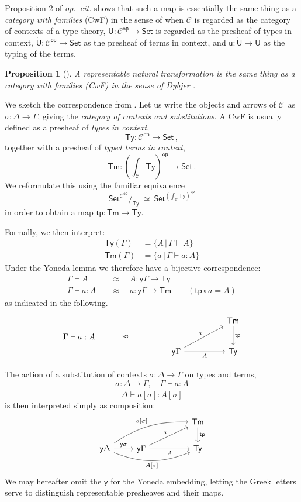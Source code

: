 \documentclass[12pt,reqno]{amsart}
\newcommand{\CC}{\ensuremath{\mathcal{C}}}
\newcommand{\op}[1]{\ensuremath{{#1}^{\mathsf{op}}}}
\newcommand{\pshx}[1]{\ensuremath{\mathsf{Set}^{\op{#1}}}}
\newcommand{\Set}{\ensuremath{\mathsf{Set}}}
\newcommand{\y}{\ensuremath{\mathsf{y}}} %
\newcommand{\tp}{\ensuremath{\mathsf{tp}}}
\newcommand{\Tm}{\ensuremath{\mathsf{Tm}}}
\newcommand{\Ty}{\ensuremath{\mathsf{Ty}}}
\renewcommand{\to}{\ensuremath{\rightarrow}}
\newcommand{\terms}[2]{#1 \vdash #2}
\newcommand{\Gterms}[1]{\terms{\Gamma}{#1}}
\renewcommand{\t}{\ensuremath{\mathsf{u}}}
\newcommand{\T}{\ensuremath{\mathsf{U}}}
\newcommand{\TT}{\ensuremath{\dot{\mathsf{U}}}}
\newtheorem{proposition}[theorem]{Proposition}
\theoremstyle{remark}
\theoremstyle{definition}
\begin{document}
Proposition 2 of \emph{op.\ cit.} shows that such a map is essentially the same thing as a \emph{category with families} (CwF) in the sense of \cite{Dybjer:CWF} when $\CC$ is regarded as the category of contexts of a type theory, $\T: \op{\CC} \to \Set$ is regarded as the presheaf of types in context, $\TT: \op{\CC} \to \Set$ as the presheaf of terms in context, and $\t : \TT\to\T$ as the typing of the terms.   

\begin{proposition}[\cite{awodey:NM, Fiore:2012}] A representable natural transformation is the same thing as a \emph{category with families (CwF)} in the sense of Dybjer \cite{Dybjer:CWF}.
\end{proposition}

We sketch the correspondence from \cite{awodey:NM}.
Let us write the objects and arrows of \CC\ as $\sigma : \Delta \to \Gamma$, giving the \emph{category of contexts and substitutions}.
A CwF is usually defined as a presheaf of \emph{types in context}, 
\[
\Ty : \CC^{\mathrm{op}}\to \Set\,,
\]
together with a presheaf of \emph{typed terms in context}, 
\[
\Tm : {\textstyle (\int_{\CC}\!\Ty)^{\mathsf{op}}\to \Set }\,.
\]
We reformulate this using the familiar equivalence
\[\textstyle
 \pshx{\CC}\!/_{\Ty}\ \simeq\ \pshx{(\int_{\CC}\Ty)}
\]
in order to obtain a map $\tp :\Tm \to \Ty$.


Formally, we then interpret:
\begin{align*}
 \Ty(\Gamma) &= \{ A \,|\, \Gamma \vdash A\} \\
 \Tm(\Gamma) &= \{ a \,|\, \Gamma \vdash a:A\} 
\end{align*}
Under the Yoneda lemma we therefore have a bijective correspondence:
\begin{align*}
\Gamma\vdash A\quad &\approx\quad A : \y{\Gamma}\to \Ty  \\
\Gterms{a:A}\quad &\approx\quad  a: \y{\Gamma}\to \Tm  \qquad (\tp\circ a = A)
\end{align*}
as indicated in the following.
\[
\begin{tikzcd}
 \strut \ar[d, phantom,"\Gamma \vdash a:A"] && \strut \ar[d, phantom,"\approx"] &&  && {\Tm} \ar[d,"{\tp}"]\\
\strut && \strut && \y\Gamma \ar[rru, "a"]   \ar[rr ,swap,  "A"]   && {\Ty}
\end{tikzcd}
\]
%

The action of a substitution of contexts $\sigma : \Delta \to \Gamma$ on types and terms,
\[
\frac{\sigma: \Delta \to \Gamma, \quad \Gamma\vdash a:A}{\Delta\vdash a[\sigma] : A[\sigma]}
\]
is then interpreted simply as composition:
\[
\begin{tikzcd}
 	&&&  {\Tm} \ar[d,"{\tp}"]\\
\y{\Delta} \ar[r,  "\y{\sigma}"] \ar[rrru, bend left = 4ex, "{a[\sigma]}"] \ar[rrr, swap, bend right = 5ex, "{A[\sigma]}"] & \y\Gamma \ar[rru, "a"]   \ar[rr ,swap,  "A"]  && {\Ty}
\end{tikzcd}
\]
%
We may hereafter omit the $\y$ for the Yoneda embedding, letting the Greek letters serve to distinguish representable presheaves and their maps.
\end{document}
